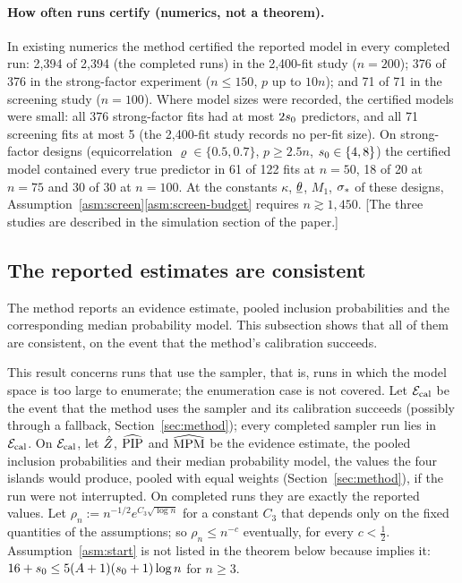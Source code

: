 \paragraph{How often runs certify (numerics, not a theorem).} In existing numerics the method certified the reported model
in every completed run: 2,394 of 2,394 (the completed runs) in the 2,400-fit study ($n=200$); 376 of 376 in the strong-factor experiment
($n\le150$, $p$ up to $10n$); and 71 of 71 in the screening study ($n=100$). Where model sizes were recorded, the certified
models were small: all 376 strong-factor fits had at most $2s_0$ predictors, and all 71 screening fits at most 5 (the
2,400-fit study records no per-fit size). On strong-factor designs (equicorrelation $\varrho\in\{0.5,0.7\}$, $p\ge2.5n$,
$s_0\in\{4,8\}$) the certified model contained every true predictor in 61 of 122 fits at $n=50$, 18 of 20 at $n=75$ and
30 of 30 at $n=100$. At the constants $\kappa$, $\underline\theta$, $M_1$, $\sigma_*$ of these designs,
Assumption~\ref{asm:screen}\ref{asm:screen-budget} requires $n\gtrsim1{,}450$. [The three studies are described in the
simulation section of the paper.]

\subsection{The reported estimates are consistent}\label{sec:outputs}

The method reports an evidence estimate, pooled inclusion probabilities and the corresponding median probability model.
This subsection shows that all of them are consistent, on the event that the method's calibration succeeds.

This result concerns runs that use the sampler, that is, runs in which the model space is too large to enumerate; the
enumeration case is not covered. Let $\mathcal E_{\mathrm{cal}}$ be the event that the method uses the sampler and its calibration succeeds
(possibly through a fallback, Section~\ref{sec:method}); every completed sampler run lies in $\mathcal E_{\mathrm{cal}}$. On $\mathcal E_{\mathrm{cal}}$, let $\hat Z$, $\widehat{\mathrm{PIP}}$ and $\widehat{\mathrm{MPM}}$ be the
evidence estimate, the pooled inclusion probabilities and their median probability model, the values the four islands would produce, pooled with equal weights (Section~\ref{sec:method}), if the run
were not interrupted. On completed runs they are exactly the reported values. Let $\rho_n:=n^{-1/2}e^{C_3\sqrt{\log n}}$ for a constant $C_3$ that depends only on the fixed quantities of the
assumptions; so $\rho_n\le n^{-c}$ eventually, for every $c<\tfrac12$. Assumption~\ref{asm:start} is not listed in the
theorem below because  implies it: $16+s_0\le5(A+1)(s_0+1)\log n$ for $n\ge3$.

